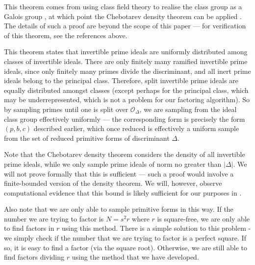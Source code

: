 \documentclass[honours,12pt]{unswthesis}
\newcommand{\order}{\mathcal{O}} %
\numberwithin{equation}{section}
\begin{document}
\noindent
This theorem comes from using class field theory to realise the class group as a Galois group \cite[Equation 9.1]{cox}, at which point the Chebotarev density theorem can be applied \cite[Equation 1.1]{lagarias}.
The details of such a proof are beyond the scope of this paper ---
for verification of this theorem, see the references above.

This theorem states that invertible prime ideals are uniformly distributed among classes of invertible ideals.
There are only finitely many ramified invertible prime ideals, since only finitely many primes divide the discriminant, and all inert prime ideals belong to the principal class.
Therefore, split invertible prime ideals are equally distributed amongst classes (except perhaps for the principal class, which may be underrepresented, which is not a problem for our factoring algorithm).
So by sampling primes until one is split over $\order_\Delta$, we are sampling from the ideal class group effectively uniformly ---
the corresponding form is precisely the form $(p, b, c)$ described earlier, which once reduced is effectively a uniform sample from the set of reduced primitive forms of discriminant $\Delta$.

Note that the Chebotarev density theorem considers the density of all invertible prime ideals, while we only sample prime ideals of norm no greater than $|\Delta|$.
We will not prove formally that this is sufficient --- 
such a proof would involve a finite-bounded version of the density theorem.
We will, however, observe computational evidence that this bound is likely sufficient for our purposes in .

Also note that we are only able to sample primitive forms in this way. 
If the number we are trying to factor is $N = s^2r$ where $r$ is square-free, we are only able to find factors in $r$ using this method.
There is a simple solution to this problem - we simply check if the number that we are trying to factor is a perfect square.
If so, it is easy to find a factor (via the square root).
Otherwise, we are still able to find factors dividing $r$ using the method that we have developed.


\pagebreak
\end{document}

